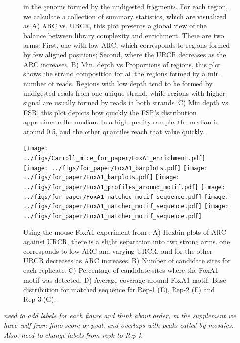 \documentclass{bmcart}\usepackage[]{graphicx}\usepackage[]{color}
\begin{document}
\begin{figure}[h!]
{    in the genome formed by the undigested fragments. For each region,
    we calculate a collection of summary statistics, which are
    visualized as A) ARC vs. URCR, this plot presents a global view of
    the balance between library complexity and enrichment. There are
    two arms: First, one with low ARC, which corresponds to regions
    formed by few aligned positions; Second, where the URCR decreases
    as the ARC increases. B) Min. depth vs Proportions of regions,
    this plot shows the strand composition for all the regions formed
    by a min. number of reads. Regions with low depth tend to be
    formed by undigested reads from one unique strand, while regions
    with higher signal are usually formed by reads in both strands. C)
    Min depth vs. FSR, this plot depicts how quickly the FSR's
    distribution approximate the median. In a high quality sample, the
    median is around 0.5, and the other quantiles reach that value
    quickly.}
  \label{fig:qcdiagram}
\end{figure}

\newpage

\begin{figure}[h!]
  \centering
  \texttt{[image: ../figs/Carroll\_mice\_for\_paper/FoxA1\_enrichment.pdf]}
  \newline
  \texttt{[image: ../figs/for\_paper/FoxA1\_barplots.pdf]}
  \texttt{[image: ../figs/for\_paper/FoxA1\_barplots.pdf]}
  \texttt{[image: ../figs/for\_paper/FoxA1\_profiles\_around\_motif.pdf]}
  \texttt{[image: ../figs/for\_paper/FoxA1\_matched\_motif\_sequence.pdf]}
  \texttt{[image: ../figs/for\_paper/FoxA1\_matched\_motif\_sequence.pdf]}
  \texttt{[image: ../figs/for\_paper/FoxA1\_matched\_motif\_sequence.pdf]}
  \caption{Using the mouse FoxA1 experiment from \cite{exoillumina}:
    A) Hexbin plots of $\mbox{ARC}$ against $\mbox{URCR}$, there is a
    slight separation into two strong arms, one corresponds to low
    $\mbox{ARC}$ and varying $\mbox{URCR}$, and for the other
    $\mbox{URCR}$ decreases as $\mbox{ARC}$ increases. B) Number of
    candidate sites for each replicate. C) Percentage of candidate
    sites where the FoxA1 motif was detected. D) Average coverage
    around FoxA1 motif. Base distribution for matched sequence for
    Rep-1 (E), Rep-2 (F) and Rep-3 (G).}
  \label{fig:enrich}
\end{figure}

{\color{red} \emph{need to add labels for each figure and think about
    order, in the supplement we have ecdf from fimo score or pval, and
    overlaps with peaks called by mosaics.
\newline
Also, need to change labels from repk to Rep-k
}}
\end{document}
